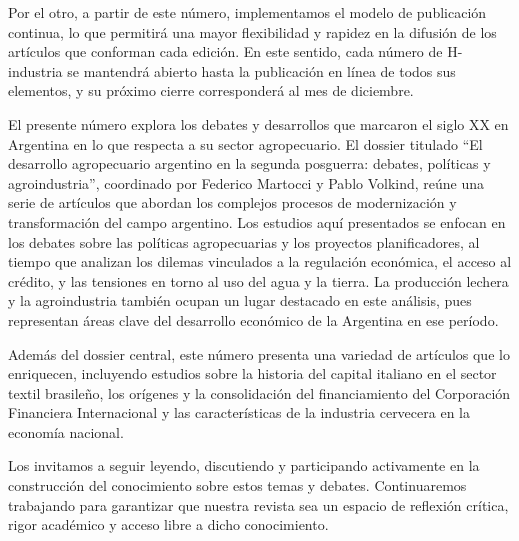 \documentclass{article}
\begin{document}
Por el otro, a partir de este número, implementamos el modelo de publicación continua, lo que permitirá una mayor flexibilidad y rapidez en la difusión de los artículos que conforman cada edición. En este sentido, cada número de H-industria se mantendrá abierto hasta la publicación en línea de todos sus elementos, y su próximo cierre corresponderá al mes de diciembre.

El presente número explora los debates y desarrollos que marcaron el siglo XX en Argentina en lo que respecta a su sector agropecuario. El dossier titulado “El desarrollo agropecuario argentino en la segunda posguerra: debates, políticas y agroindustria”, coordinado por Federico Martocci y Pablo Volkind, reúne una serie de artículos que abordan los complejos procesos de modernización y transformación del campo argentino. Los estudios aquí presentados se enfocan en los debates sobre las políticas agropecuarias y los proyectos planificadores, al tiempo que analizan los dilemas vinculados a la regulación económica, el acceso al crédito, y las tensiones en torno al uso del agua y la tierra. La producción lechera y la agroindustria también ocupan un lugar destacado en este análisis, pues representan áreas clave del desarrollo económico de la Argentina en ese período.

Además del dossier central, este número presenta una variedad de artículos que lo enriquecen, incluyendo estudios sobre la historia del capital italiano en el sector textil brasileño, los orígenes y la consolidación del financiamiento del Corporación Financiera Internacional y las características de la industria cervecera en la economía nacional.

Los invitamos a seguir leyendo, discutiendo y participando activamente en la construcción del conocimiento sobre estos temas y debates. Continuaremos trabajando para garantizar que nuestra revista sea un espacio de reflexión crítica, rigor académico y acceso libre a dicho conocimiento.
\end{document}
